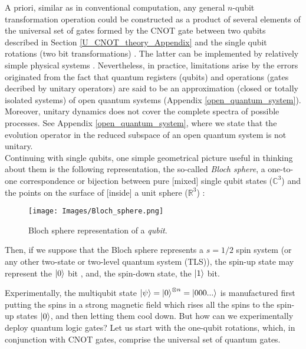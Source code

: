 \documentclass[11pt]{article}
\numberwithin{equation}{section} %
\numberwithin{figure}{section} %
\begin{document}
\begin{appendices}
A priori, similar as in conventional computation, any general $n$-qubit transformation operation could be constructed as a product of several elements of the universal set of gates formed by the CNOT gate between two qubits described in Section \ref{U_CNOT_theory_Appendix} and the single qubit rotations (two bit transformations) \cite[p.~22, l.~5-6]{Nielsen} \cite[p.~6, l.~25-27]{Shor}. The latter can be implemented by relatively simple physical systems \cite[p.~6, l.~17]{Shor}.  Nevertheless, in practice, limitations arise by the errors originated from the fact that quantum registers (qubits) and operations (gates decribed by unitary operators) are said to be an approximation (closed or totally isolated systems) of open quantum systems (Appendix \ref{open_quantum_system}). Moreover, unitary dynamics does not cover the complete spectra of possible processes. See Appendix \ref{open_quantum_system}, where we state that the evolution operator in the reduced subspace of an open quantum system is not unitary.\\



 Continuing with single qubits, one simple geometrical picture useful in thinking about them is the following representation, the so-called \emph{Bloch sphere}, a one-to-one correspondence or bijection between pure [mixed] single qubit states ($\mathbb{C}^3$) and the points on the surface of [inside] a unit sphere ($\mathbb{R}^3$) \cite[p.~15]{Nielsen}: 
\begin{figure}[H] 
	\centering
	\texttt{[image: Images/Bloch\_sphere.png]}
	\caption{Bloch sphere representation of a \emph{qubit}.}
	  \label{fig:Bloch_sphere}
\end{figure}


Then, if we suppose that the Bloch sphere represents a $s=1/2$ spin system (or any other two-state or two-level quantum system (TLS)), the spin-up state may represent the $\ket{0}$ bit , and, the spin-down state, the $\ket{1}$ bit. 

Experimentally, the multiqubit state $\ket{\psi}=\ket{0}^{\otimes n}=\ket{000...}$ is manufactured first putting the spins in a strong magnetic field which rises all the spins to the spin-up states $\ket{0}$, and then letting them cool down. But how can we experimentally deploy quantum logic gates? Let us start with the one-qubit rotations, which, in conjunction with CNOT gates, comprise the universal set of quantum gates. 


\end{appendices}
\end{document}
